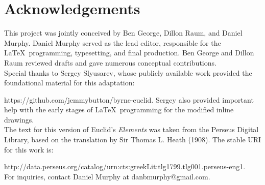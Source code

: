 \documentclass[12pt, twoside]{memoir}
\begin{document}
\label{Acknowledgements}
\chapter*{Acknowledgements}
\renewcommand{\currentpropheader}{Acknowledgements}
This project was jointly conceived by Ben George, Dillon Raum, and Daniel Murphy. Daniel Murphy served as the lead editor, responsible for the \LaTeX\ programming, typesetting, and final production. Ben George and Dillon Raum reviewed drafts and gave numerous conceptual contributions. \\

Special thanks to Sergey Slyusarev, whose publicly available work provided the foundational material for this adaptation: \par
\noindent https://github.com/jemmybutton/byrne-euclid. Sergey also provided important help with the early stages of \LaTeX\ programming for the modified inline drawings. \\

The text for this version of Euclid's \textit{Elements} was taken from the Perseus Digital Library, based on the translation by Sir Thomas L. Heath (1908). The stable URI for this work is: \par 
\noindent http://data.perseus.org/catalog/urn:cts:greekLit:tlg1799.tlg001.perseus-eng1. \\

For inquiries, contact Daniel Murphy at danbmurphy@gmail.com.

\setlength{\parindent}{0pt} %

\mainmatter %

\label{Definitions}
\end{document}
